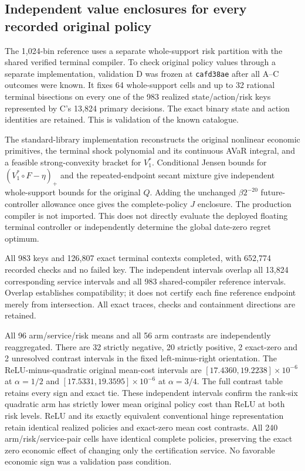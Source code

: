 \subsection{Independent value enclosures for every recorded original policy}
\label{sec:study119d}
The 1,024-bin reference uses a separate whole-support risk partition with the
shared verified terminal compiler. To check original policy values through a
separate implementation, validation D was frozen at \texttt{cafd38ae}
after all A--C outcomes were known. It fixes 64 whole-support cells and up to 32
rational terminal bisections on every one of the 983 realized state/action/risk
keys represented by C's 13,824 primary decisions. The exact binary state and
action identities are retained. This is validation of the known catalogue.

The standard-library implementation reconstructs the original nonlinear
economic primitives, the terminal shock polynomial and its continuous AVaR
integral, and a feasible strong-convexity bracket for $V_1^*$. Conditional
Jensen bounds for $(V_1^*\circ F-\eta)_+$ and the repeated-endpoint secant
mixture give independent whole-support bounds for the original $Q$.
Adding the unchanged $\beta 2^{-20}$ future-controller allowance once gives
the complete-policy $J$ enclosure. The production compiler is not imported.
This does not directly evaluate the deployed floating terminal controller or
independently determine the global date-zero regret optimum.

All 983 keys and 126,807 exact terminal contexts completed, with
652,774 recorded checks and no failed key.
The independent intervals overlap all 13,824 corresponding service intervals
and all 983 shared-compiler reference intervals. Overlap establishes
compatibility; it does not certify each fine reference endpoint merely from
intersection. All exact traces, checks and containment directions are retained.



All 96 arm/service/risk means and all 56 arm contrasts are independently
reaggregated. There are 32 strictly negative, 20
strictly positive, 2 exact-zero and 2
unresolved contrast intervals in the fixed left-minus-right orientation.
The ReLU-minus-quadratic original mean-cost intervals are
$[17.4360, 19.2238]\times10^{-6}$
at $\alpha=1/2$ and
$[17.5331, 19.3595]\times10^{-6}$
at $\alpha=3/4$. The full contrast table retains every sign and exact tie.
These independent intervals confirm the rank-six quadratic arm has strictly lower mean original policy cost than ReLU at both risk levels. ReLU and its exactly equivalent conventional hinge representation retain identical realized policies and exact-zero mean cost contrasts.
All 240 arm/risk/service-pair cells have identical complete policies, preserving
the exact zero economic effect of changing only the certification service.
No favorable economic sign was a validation pass condition.

